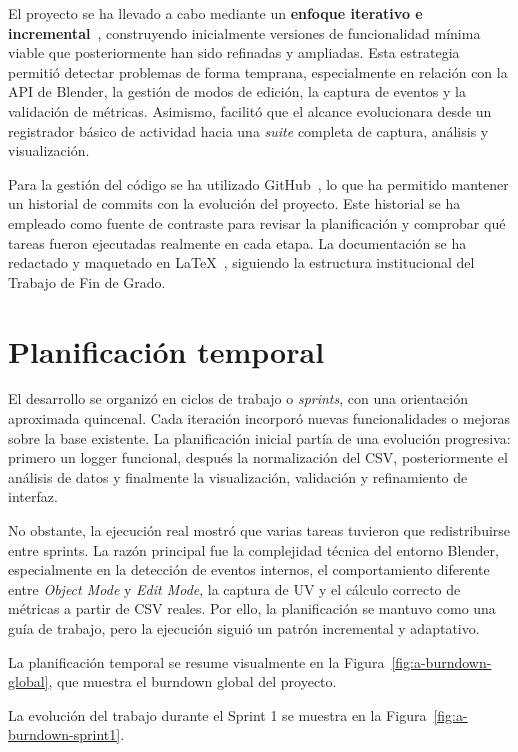 El proyecto se ha llevado a cabo mediante un \textbf{enfoque iterativo e incremental}~\cite{pressman2005,schwabermethod}, construyendo inicialmente versiones de funcionalidad mínima viable que posteriormente han sido refinadas y ampliadas. Esta estrategia permitió detectar problemas de forma temprana, especialmente en relación con la API de Blender, la gestión de modos de edición, la captura de eventos y la validación de métricas. Asimismo, facilitó que el alcance evolucionara desde un registrador básico de actividad hacia una \textit{suite} completa de captura, análisis y visualización.

Para la gestión del código se ha utilizado GitHub~\cite{github}, lo que ha permitido mantener un historial de commits con la evolución del proyecto. Este historial se ha empleado como fuente de contraste para revisar la planificación y comprobar qué tareas fueron ejecutadas realmente en cada etapa. La documentación se ha redactado y maquetado en \LaTeX~\cite{wiki:latex}, siguiendo la estructura institucional del Trabajo de Fin de Grado.

\section{Planificación temporal}
\label{sec:a-planificacion-temporal}

El desarrollo se organizó en ciclos de trabajo o \textit{sprints}, con una orientación aproximada quincenal. Cada iteración incorporó nuevas funcionalidades o mejoras sobre la base existente. La planificación inicial partía de una evolución progresiva: primero un logger funcional, después la normalización del CSV, posteriormente el análisis de datos y finalmente la visualización, validación y refinamiento de interfaz.

No obstante, la ejecución real mostró que varias tareas tuvieron que redistribuirse entre sprints. La razón principal fue la complejidad técnica del entorno Blender, especialmente en la detección de eventos internos, el comportamiento diferente entre \textit{Object Mode} y \textit{Edit Mode}, la captura de UV y el cálculo correcto de métricas a partir de CSV reales. Por ello, la planificación se mantuvo como una guía de trabajo, pero la ejecución siguió un patrón incremental y adaptativo.

La planificación temporal se resume visualmente en la Figura~\ref{fig:a-burndown-global}, que muestra el burndown global del proyecto.

La evolución del trabajo durante el Sprint 1 se muestra en la Figura~\ref{fig:a-burndown-sprint1}.

